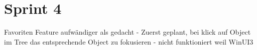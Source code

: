 \section{Sprint 4}\label{sprint4}


Favoriten Feature aufwändiger als gedacht
- Zuerst geplant, bei klick auf Object im Tree das entsprechende Object zu fokusieren
   - nicht funktioniert weil WinUI3